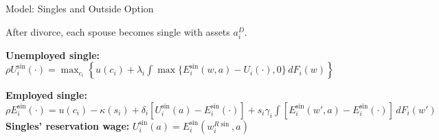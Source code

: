 \documentclass[aspectratio=169, 11pt]{beamer}
\begin{document}
\begin{frame}{Model: Singles and Outside Option}

After divorce, each spouse becomes single with assets $a_i^D$. \\
\vspace{1.5em}

\textbf{Unemployed single:}
$\rho U^{\sin}_i(\cdot) = \max_{c_i}\left\{u(c_i) + \lambda_i \int \max\{E^{\sin}_i(w,a) - U_i(\cdot), 0\}\,dF_i(w)\right\}$

\vspace{1.5em}
\textbf{Employed single:}
$\rho E^{\sin}_i(\cdot) = u(c_i) - \kappa(s_i) + \delta_i[U^{\sin}_i(a) - E^{\sin}_i(\cdot)] + s_i\gamma_i \int [E^{\sin}_i(w', a) - E^{\sin}_i(\cdot)]\,dF_i(w')$ \\

\vspace{1.5em}
\textbf{Singles' reservation wage:} $U^{\sin}_i(a) = E^{\sin}_i(w^{R\sin}_i, a)$

\end{frame}






\end{document}
